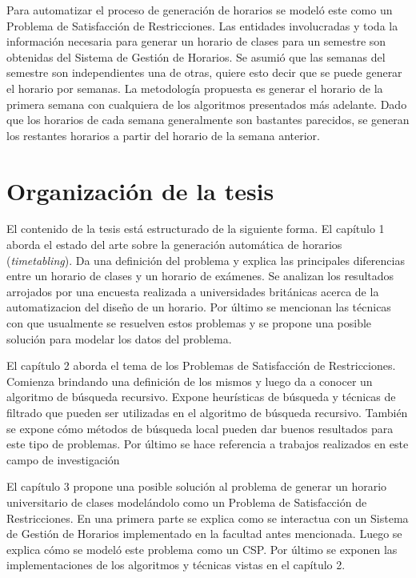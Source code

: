\begin{introduction}
Para automatizar el proceso de generaci\'on de horarios se model\'o este como un Problema de Satisfacci\'on de Restricciones. Las entidades involucradas y toda la informaci\'on necesaria para generar un horario de clases para un semestre son obtenidas del Sistema de Gestión de Horarios. Se asumi\'o que las semanas del semestre son independientes una de otras, quiere esto decir que se puede generar el horario por semanas. La metodología propuesta es generar el horario de la primera semana con cualquiera de los algoritmos presentados más adelante. Dado que los horarios de cada semana generalmente son bastantes parecidos, se generan los restantes horarios a partir del horario de la semana anterior.

\section*{Organización de la tesis}

El contenido de la tesis está estructurado de la siguiente forma. El cap\'itulo 1 aborda el estado del arte sobre la generaci\'on autom\'atica de horarios (\emph{timetabling}). Da una definici\'on del problema y explica las principales diferencias entre un horario de clases y un horario de ex\'amenes. Se analizan los resultados arrojados por una encuesta realizada a universidades brit\'anicas acerca de la automatizacion del diseño de un horario. Por \'ultimo se mencionan las t\'ecnicas con que usualmente se resuelven estos problemas y se propone una posible soluci\'on para modelar los datos del problema.

El cap\'itulo 2 aborda el tema de los Problemas de Satisfacci\'on de Restricciones. Comienza brindando una definici\'on de los mismos y luego da a conocer un algoritmo de b\'usqueda recursivo. Expone heur\'isticas de b\'usqueda y t\'ecnicas de filtrado que pueden ser utilizadas en el algoritmo de b\'usqueda recursivo. Tambi\'en se expone c\'omo m\'etodos de b\'usqueda local pueden dar buenos resultados para este tipo de problemas. Por \'ultimo se hace referencia a trabajos realizados en este campo de investigaci\'on 

El cap\'itulo 3 propone una posible soluci\'on al problema de generar un horario universitario de clases model\'andolo como un Problema de Satisfacci\'on de Restricciones. En una primera parte se explica como se interactua con un Sistema de Gesti\'on de Horarios implementado en la facultad antes mencionada. Luego se explica c\'omo se model\'o este problema como un CSP. Por \'ultimo se exponen las implementaciones de los algoritmos y t\'ecnicas vistas en el cap\'itulo 2.


\end{introduction}

